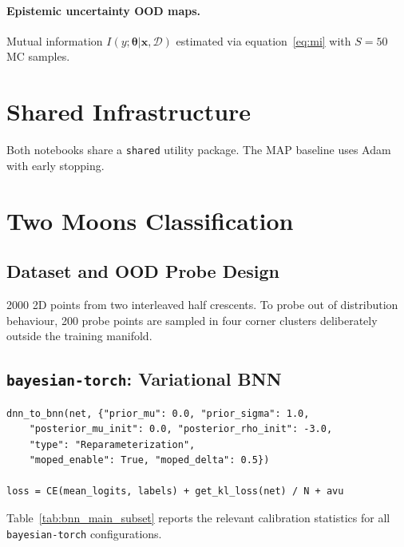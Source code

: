 \documentclass[conference]{IEEEtran}
\newcommand{\btheta}{\bm{\theta}}
\newcommand{\cD}{\mathcal{D}}
\begin{document}
\paragraph{Epistemic uncertainty OOD maps.}
Mutual information $I(y;\btheta|\bm{x},\cD)$ estimated via
equation~\eqref{eq:mi} with $S=50$ MC samples.

\section{Shared Infrastructure}
\label{sec:shared}

Both notebooks share a \texttt{shared} utility package. The MAP baseline uses Adam with early stopping.

\section{Two Moons Classification}
\label{sec:twomoons}

\subsection{Dataset and OOD Probe Design}

2000 2D points from two interleaved half crescents.
To probe out of distribution behaviour, 200 probe points are
sampled in four corner clusters deliberately outside the training manifold.

\subsection{\texttt{bayesian-torch}: Variational BNN}
\label{sec:bnn}

\begin{lstlisting}[caption={BNN conversion and ELBO AvUC training.}]
dnn_to_bnn(net, {"prior_mu": 0.0, "prior_sigma": 1.0,
    "posterior_mu_init": 0.0, "posterior_rho_init": -3.0,
    "type": "Reparameterization",
    "moped_enable": True, "moped_delta": 0.5})

loss = CE(mean_logits, labels) + get_kl_loss(net) / N + avu
\end{lstlisting}

Table~\ref{tab:bnn_main_subset} reports the relevant calibration statistics for all \texttt{bayesian-torch} configurations.
\end{document}
